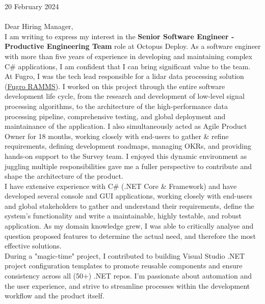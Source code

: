 \vspace{30pt}

20 February 2024 \\ \\

Dear Hiring Manager, \\

I am writing to express my interest in the \textbf{Senior Software Engineer - Productive Engineering Team} role at Octopus Deploy. As a software engineer with more than five years of experience in developing and maintaining complex C\# applications, I am confident that I can bring significant value to the team. \\

At Fugro, I was the tech lead responsible for a lidar data processing solution (\href{https://www.youtube.com/watch?v=f65bdm4tous}{\underline{Fugro RAMMS}}). I worked on this project through the entire software development life cycle, from the research and development of low-level signal processing algorithms, to the architecture of the high-performance data processing pipeline, comprehensive testing, and global deployment and maintainance of the application. I also simultaneously acted as Agile Product Owner for 18 months, working closely with end-users to gather \& refine requirements, defining development roadmaps, managing OKRs, and providing hands-on support to the Survey team. I enjoyed this dynamic environment as juggling multiple responsibilities gave me a fuller perspective to contribute and shape the architecture of the product. \\

I have extensive experience with C\# (.NET Core \& Framework) and have developed several console and GUI applications, working closely with end-users and global stakeholders to gather and understand their requirements, define the system's functionality and write a maintainable, highly testable, and robust application. As my domain knowledge grew, I was able to critically analyse and question proposed features to determine the actual need, and therefore the most effective solutions. \\

During a "magic-time" project, I contributed to building Visual Studio .NET project configuration templates to promote reusable components and ensure consistency across all (50+) .NET repos. I'm passionate about automation and the user experience, and strive to streamline processes within the development workflow and the product itself. \\

